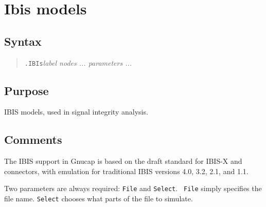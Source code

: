 %
%
%
%
\section{Ibis models}
\subsection{Syntax}
\begin{verse}
{\tt .IBIs}{\it label nodes ... parameters ...}
\end{verse}
\subsection{Purpose}

IBIS models, used in signal integrity analysis.
\subsection{Comments}

The IBIS support in Gnucap is based on the draft standard for IBIS-X and
connectors, with emulation for traditional IBIS versions 4.0, 3.2,
2.1, and 1.1.

Two parameters are always required: {\tt File} and {\tt Select}.  {\tt
  File} simply specifies the file name.  {\tt Select} chooses what
parts of the file to simulate.

